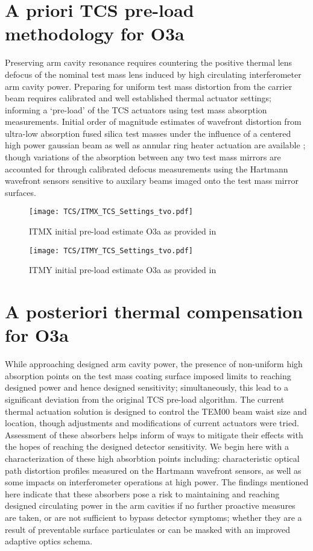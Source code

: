 \section{A priori TCS pre-load methodology for O3a}\label{sec:tvopreload}
Preserving arm cavity resonance requires countering the positive thermal lens defocus of the nominal test mass lens induced by high circulating interferometer arm cavity power. Preparing for uniform test mass distortion from the carrier beam requires calibrated and well established thermal actuator settings; informing a `pre-load' of the TCS actuators using test mass absorption measurements. Initial order of magnitude estimates of wavefront distortion from ultra-low absorption fused silica test masses under the influence of a centered high power gaussian beam as well as annular ring heater actuation are available \cite{hellovinet:1990, ramette:2016}; though variations of the absorption between any two test mass mirrors are accounted for through calibrated defocus measurements using the Hartmann wavefront sensors sensitive to auxilary beams imaged onto the test mass mirror surfaces. 

\begin{figure}[h]
  \centering
  \texttt{[image: TCS/ITMX\_TCS\_Settings\_tvo.pdf]}
  \hfill
  \caption{ITMX initial pre-load estimate O3a as provided in \cite{tvo}} 
  \label{fig:O3_ITMX_preload_tvo}
\end{figure}

\begin{figure}[H]
  \centering
  \texttt{[image: TCS/ITMY\_TCS\_Settings\_tvo.pdf]}
  \hfill
  \caption{ITMY initial pre-load estimate O3a as provided in \cite{tvo}} 
  \label{fig:O3_ITMY_preload_tvo}
\end{figure}

\section{A posteriori thermal compensation for O3a}
While approaching designed arm cavity power, the presence of non-uniform high absorption points on the test mass coating surface imposed limits to reaching designed power and hence designed sensitivity; simultaneously, this lead to a significant deviation from the original TCS pre-load algorithm. The current thermal actuation solution is designed to control the TEM00 beam waist size and location, though adjustments and modifications of current actuators were tried. Assessment of these absorbers helps inform of ways to mitigate their effects with the hopes of reaching the designed detector sensitivity. We begin here with a characterization of these high absorbtion points including: characteristic optical path distortion profiles measured on the Hartmann wavefront sensors, as well as some impacts on interferometer operations at high power. The findings mentioned here indicate that these absorbers pose a risk to maintaining and reaching designed circulating power in the arm cavities if no further proactive measures are taken, or are not sufficient to bypass detector symptoms; whether they are a result of preventable surface particulates or can be masked with an improved adaptive optics schema.  

